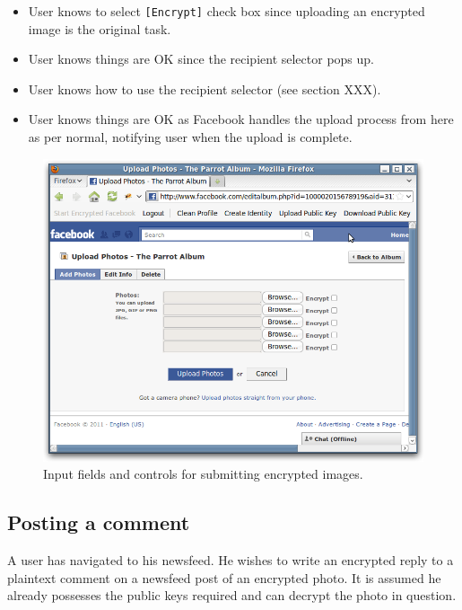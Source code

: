 \begin{desc}
\begin{itemize}
            \item User knows to select {\tt [Encrypt]} check box since uploading an encrypted image is the original task.
            
            \item User knows things are OK since the recipient selector pops up.
            
            \item User knows how to use the recipient selector (see section XXX).
            
            \item User knows things are OK as Facebook handles the upload process from here as per normal, notifying user when the upload is complete.
            
        \end{itemize}
    
\end{desc}


    \begin{figure}[tbph]
        \begin{center}
        
                \includegraphics[width=12cm]{screens/pic-upload.png}

            \caption{Input fields and controls for submitting encrypted images.}
            \label{scn:pic-up}
        \end{center}
    \end{figure}

\subsection{Posting a comment}
A user has navigated to his newsfeed. He wishes to write an encrypted reply to a plaintext comment on a newsfeed post of an encrypted photo. It is assumed he already possesses the public keys required and can decrypt the photo in question.


